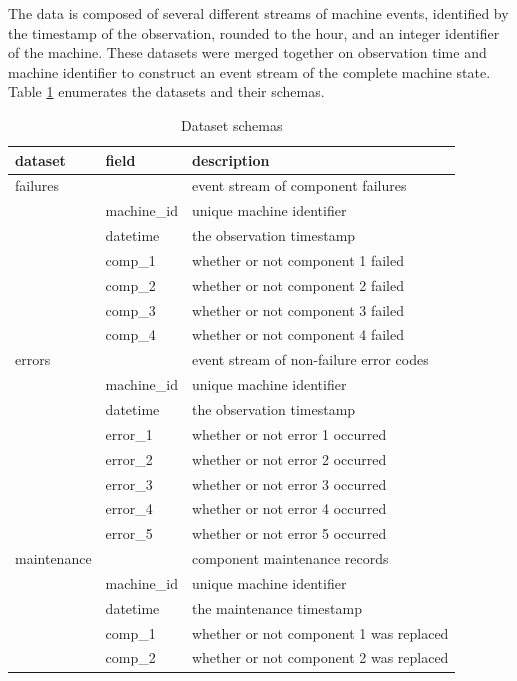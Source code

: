 \documentclass{article}
\begin{document}
The data is composed of several different streams of machine events, identified by the timestamp of the observation, rounded to the hour, and an integer identifier of the machine. These datasets were merged together on observation time and machine identifier to construct an event stream of the complete machine state. Table \ref{tab:datasets} enumerates the datasets and their schemas.

\begin{table}[!ht]
\centering
\caption{Dataset schemas}
\label{tab:datasets}
\begin{tabular}{lll}
\toprule
dataset & field & description\\
\midrule
failures 	&				& event stream of component failures\\
			& machine\_id 	& unique machine identifier\\
			& datetime 		& the observation timestamp\\
            & comp\_1		& whether or not component 1 failed\\
            & comp\_2		& whether or not component 2 failed\\
            & comp\_3		& whether or not component 3 failed\\
            & comp\_4		& whether or not component 4 failed\\
\midrule
errors		&				& event stream of non-failure error codes\\
			& machine\_id 	& unique machine identifier\\
			& datetime 		& the observation timestamp\\
            & error\_1		& whether or not error 1 occurred\\
            & error\_2		& whether or not error 2 occurred\\
            & error\_3		& whether or not error 3 occurred\\
            & error\_4		& whether or not error 4 occurred\\
            & error\_5		& whether or not error 5 occurred\\
\midrule
maintenance	& 				& component maintenance records\\
			& machine\_id 	& unique machine identifier\\
			& datetime 		& the maintenance timestamp\\
            & comp\_1		& whether or not component 1 was replaced\\
            & comp\_2		& whether or not component 2 was replaced\\

\end{tabular}
\end{table}
\end{document}

